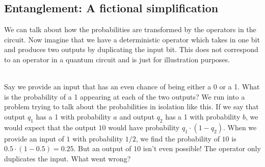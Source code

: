 \documentclass[runningheads]{llncs}
\begin{document}
\subsection{Entanglement: A fictional simplification}

We can talk about how the probabilities are transformed by the operators in the circuit. Now imagine that we have a
deterministic operator which takes in one bit and produces two outputs by duplicating the input bit. This does not correspond to an operator in a quantum circuit and is just for illustration purposes.
\\

\begin{minipage}{.5\textwidth}
    \centering
{}
\end{minipage}
\\

Say we provide an input that has an even chance of being either a 0 or a 1. What is the probability of a 1 appearing at each of the two outputs?
We run into a problem trying to talk about the probabilities in isolation like this. If we say that output $q_1$ has a 1 with probability
$a$ and output $q_2$ has a 1 with probability $b$, we would expect that the output $10$ would have probability $q_1 \cdot (1 - q_2)$. When
we provide an input of $1$ with probability $1/2$, we find the probability of $10$ is $0.5 \cdot (1 - 0.5) = 0.25$. But an
output of $10$ isn't even possible! The operator only duplicates the input. What went wrong?
\end{document}
